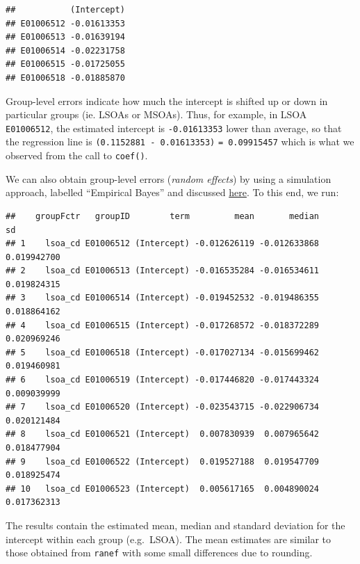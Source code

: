 \documentclass[
]{book}
\newenvironment{Shaded}{\begin{snugshade}}{\end{snugshade}}
\newcommand{\CommentTok}[1]{\textcolor[rgb]{0.56,0.35,0.01}{\textit{#1}}}
\newcommand{\DecValTok}[1]{\textcolor[rgb]{0.00,0.00,0.81}{#1}}
\newcommand{\KeywordTok}[1]{\textcolor[rgb]{0.13,0.29,0.53}{\textbf{#1}}}
\newcommand{\NormalTok}[1]{#1}
\newcommand{\OperatorTok}[1]{\textcolor[rgb]{0.81,0.36,0.00}{\textbf{#1}}}
\newcommand{\StringTok}[1]{\textcolor[rgb]{0.31,0.60,0.02}{#1}}
\begin{document}
\begin{verbatim}
##           (Intercept)
## E01006512 -0.01613353
## E01006513 -0.01639194
## E01006514 -0.02231758
## E01006515 -0.01725055
## E01006518 -0.01885870
\end{verbatim}

Group-level errors indicate how much the intercept is shifted up or down in particular groups (ie. LSOAs or MSOAs). Thus, for example, in LSOA \texttt{E01006512}, the estimated intercept is \texttt{-0.01613353} lower than average, so that the regression line is \texttt{(0.1152881\ -\ 0.01613353)} \texttt{=\ 0.09915457} which is what we observed from the call to \texttt{coef()}.

We can also obtain group-level errors (\emph{random effects}) by using a simulation approach, labelled ``Empirical Bayes'' and discussed \href{https://stat.ethz.ch/pipermail/r-sig-mixed-models/2009q4/002984.html}{here}. To this end, we run:

\begin{Shaded}
\end{Shaded}

\begin{verbatim}
##    groupFctr   groupID        term         mean       median          sd
## 1    lsoa_cd E01006512 (Intercept) -0.012626119 -0.012633868 0.019942700
## 2    lsoa_cd E01006513 (Intercept) -0.016535284 -0.016534611 0.019824315
## 3    lsoa_cd E01006514 (Intercept) -0.019452532 -0.019486355 0.018864162
## 4    lsoa_cd E01006515 (Intercept) -0.017268572 -0.018372289 0.020969246
## 5    lsoa_cd E01006518 (Intercept) -0.017027134 -0.015699462 0.019460981
## 6    lsoa_cd E01006519 (Intercept) -0.017446820 -0.017443324 0.009039999
## 7    lsoa_cd E01006520 (Intercept) -0.023543715 -0.022906734 0.020121484
## 8    lsoa_cd E01006521 (Intercept)  0.007830939  0.007965642 0.018477904
## 9    lsoa_cd E01006522 (Intercept)  0.019527188  0.019547709 0.018925474
## 10   lsoa_cd E01006523 (Intercept)  0.005617165  0.004890024 0.017362313
\end{verbatim}

The results contain the estimated mean, median and standard deviation for the intercept within each group (e.g.~LSOA). The mean estimates are similar to those obtained from \texttt{ranef} with some small differences due to rounding.
\end{document}
